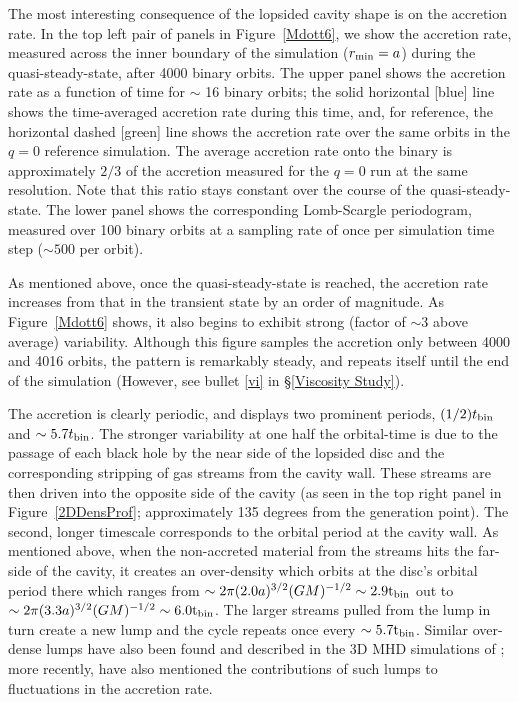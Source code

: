 The most interesting consequence of the lopsided cavity shape is on
the accretion rate.  In the top left pair of panels in
Figure~\ref{Mdott6}, we show the accretion rate, measured across the
inner boundary of the simulation ($r_{\rm min}=a$) during the
quasi-steady-state, after 4000 binary orbits.  The upper panel shows
the accretion rate as a function of time for $\sim$ 16 binary
orbits; the solid horizontal [blue] line shows the time-averaged
accretion rate during this time, and, for reference, the horizontal
dashed [green] line shows the accretion rate over the same orbits in
the $q=0$ reference simulation. The average accretion
rate onto the binary is approximately $2/3$ of the accretion measured 
for the $q=0$ run at the same resolution. Note that this ratio stays constant 
over the course of the quasi-steady-state.
The lower panel shows the corresponding Lomb-Scargle periodogram, measured over
100 binary orbits at a sampling rate of once per simulation time step
($\sim 500$ per orbit).

As mentioned above, once the quasi-steady-state is reached, the
accretion rate increases from that in the transient state by an order
of magnitude.  As Figure~\ref{Mdott6} shows, it also begins to exhibit
strong (factor of $\sim 3$ above average) variability.  Although this figure samples
the accretion only between 4000 and 4016 orbits, the pattern is
remarkably steady, and repeats itself until the end of the simulation (However, see bullet \ref{vi} in \S \ref{Viscosity Study}). 


The accretion is clearly periodic, and displays two prominent
periods, $(1/2)t_{\rm bin}$ and $\sim5.7t_{\rm bin}$.  The stronger
variability at one half the orbital-time is due to the passage of each
black hole by the near side of the lopsided disc and the corresponding
stripping of gas streams from the cavity wall. These streams are then
driven into the opposite side of the cavity (as seen in the top right
panel in Figure~\ref{2DDensProf}; approximately 135 degrees from the
generation point).  The second, longer timescale corresponds to the
orbital period at the cavity wall.  As mentioned above, when the
non-accreted material from the streams hits the far-side of the
cavity, it creates an over-density which orbits at the disc's
orbital period there which ranges from $\sim 2 \pi (2.0a)^{3/2} (GM)^{-1/2} \sim
2.9\rm{t}_{\rm{bin}}$ out to $\sim2 \pi (3.3a)^{3/2} (GM)^{-1/2} \sim
6.0\rm{t}_{\rm{bin}}$. The larger streams pulled from the lump in turn create 
a new lump and the cycle repeats once every $\sim 5.7 \rm{t}_{\rm{bin}}$.
Similar over-dense lumps have also been found
and described in the 3D MHD simulations of \cite{ShiKrolik:2012}; more
recently, \cite{RoedigDotti:2011, Roedig:2012} have also mentioned the
contributions of such lumps to fluctuations in the accretion rate.



